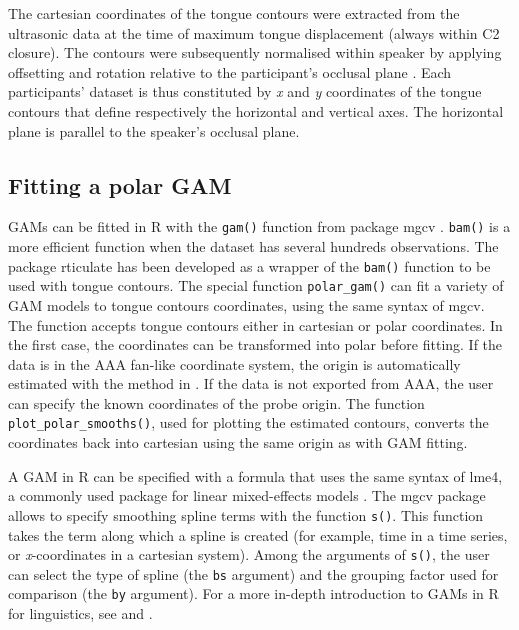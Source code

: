 \documentclass[
  11pt,
]{article}
\begin{document}
The cartesian coordinates of the tongue contours were extracted from the
ultrasonic data at the time of maximum tongue displacement (always
within C2 closure). The contours were subsequently normalised within
speaker by applying offsetting and rotation relative to the
participant's occlusal plane \citep{scobbie2011}. Each participants'
dataset is thus constituted by \emph{x} and \emph{y} coordinates of the
tongue contours that define respectively the horizontal and vertical
axes. The horizontal plane is parallel to the speaker's occlusal plane.

\hypertarget{fitting-a-polar-gam}{%
\subsection{Fitting a polar GAM}\label{fitting-a-polar-gam}}

GAMs can be fitted in R with the \texttt{gam()} function from package
mgcv \citep{wood2011, wood2017}. \texttt{bam()} is a more efficient
function when the dataset has several hundreds observations. The package
rticulate has been developed as a wrapper of the \texttt{bam()} function
to be used with tongue contours. The special function
\texttt{polar\_gam()} can fit a variety of GAM models to tongue contours
coordinates, using the same syntax of mgcv. The function accepts tongue
contours either in cartesian or polar coordinates. In the first case,
the coordinates can be transformed into polar before fitting. If the
data is in the AAA fan-like coordinate system, the origin is
automatically estimated with the method in \citet{heyne2015a}. If the
data is not exported from AAA, the user can specify the known
coordinates of the probe origin. The function
\texttt{plot\_polar\_smooths()}, used for plotting the estimated
contours, converts the coordinates back into cartesian using the same
origin as with GAM fitting.

A GAM in R can be specified with a formula that uses the same syntax of
lme4, a commonly used package for linear mixed-effects models
\citep{bates2015}. The mgcv package allows to specify smoothing spline
terms with the function \texttt{s()}. This function takes the term along
which a spline is created (for example, time in a time series, or
\emph{x}-coordinates in a cartesian system). Among the arguments of
\texttt{s()}, the user can select the type of spline (the \texttt{bs}
argument) and the grouping factor used for comparison (the \texttt{by}
argument). For a more in-depth introduction to GAMs in R for
linguistics, see \citet{soskuthy2017} and \citet{wieling2017}.
\end{document}
